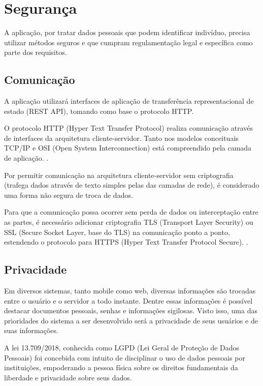 \documentclass[
    12pt,               %
    openright,          %
    oneside,
    a4paper,            %
    BIBLATEX,           %
    TODO,               %
    english,            %
    brazil              %
    ]{ifsp-spo-inf-ctds}
\begin{document}
    
    \section{Segurança}
    
        A aplicação, por tratar dados pessoais que podem identificar indivíduo, precisa utilizar métodos seguros e que cumpram regulamentação legal e específica como parte dos requisitos.
    
        \subsection{Comunicação}
        
            A aplicação utilizará interfaces de aplicação de transferência representacional de estado (REST API), tomando como base o protocolo HTTP.
        
            O protocolo HTTP (Hyper Text Transfer Protocol) realiza comunicação através de interfaces da arquitetura cliente-servidor. Tanto nos modelos conceituais TCP/IP e OSI (Open System Interconnection) está compreendido pela camada de aplicação. \cite{PetersonRedes}.
        
            Por permitir comunicação na arquitetura cliente-servidor sem criptografia (trafega dados através de texto simples pelas das camadas de rede), é considerado uma forma não segura de troca de dados.
            
            Para que a comunicação possa ocorrer sem perda de dados ou interceptação entre as partes, é necessário adicionar criptografia TLS (Transport Layer Security) ou SSL (Secure Socket Layer, base do TLS) na comunicação ponto a ponto, estendendo o protocolo para HTTPS (Hyper Text Transfer Protocol Secure). \cite{PetersonRedes}.
            
        \subsection{Privacidade}
        
            Em diversos sistemas, tanto mobile como web, diversas informações são trocadas entre o usuário e o servidor a todo instante. Dentre essas informações é possível destacar documentos pessoais, senhas e informações sigilosas. Visto isso, uma das prioridades do sistema a ser desenvolvido será a privacidade de seus usuários e de suas informações.
        
            A lei 13.709/2018, conhecida como LGPD (Lei Geral de Proteção de Dados Pessoais) foi concebida com intuito de disciplinar o uso de dados pessoais por instituições, empoderando a pessoa física sobre os direitos fundamentais da liberdade e privacidade sobre seus dados. \cite{lgpd}
            
\end{document}
